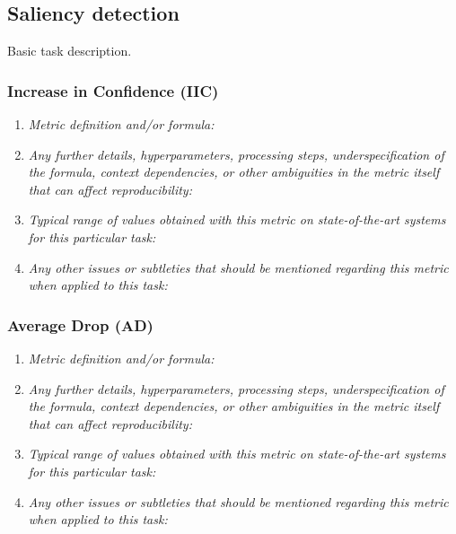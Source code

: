 \documentclass[a4paper,11pt]{article}
\begin{document}
    \subsection{Saliency detection}
        Basic task description.
        \subsubsection{Increase in Confidence (IIC)}
            \begin{enumerate}[label=\alph*.]
                \item \textit{Metric definition and/or formula:}
                \bigskip
                \item \textit{Any further details, hyperparameters, processing steps, underspecification of the formula, context dependencies, or other ambiguities in the metric itself that can affect reproducibility:}
                \bigskip
                \item \textit{Typical range of values obtained with this metric on state-of-the-art systems for this particular task:}
                \bigskip
                \item \textit{Any other issues or subtleties that should be mentioned regarding this metric when applied to this task:}
                \bigskip
            \end{enumerate}
        \subsubsection{Average Drop (AD)}
            \begin{enumerate}[label=\alph*.]
                \item \textit{Metric definition and/or formula:}
                \bigskip
                \item \textit{Any further details, hyperparameters, processing steps, underspecification of the formula, context dependencies, or other ambiguities in the metric itself that can affect reproducibility:}
                \bigskip
                \item \textit{Typical range of values obtained with this metric on state-of-the-art systems for this particular task:}
                \bigskip
                \item \textit{Any other issues or subtleties that should be mentioned regarding this metric when applied to this task:}
                \bigskip
            \end{enumerate}
\end{document}
